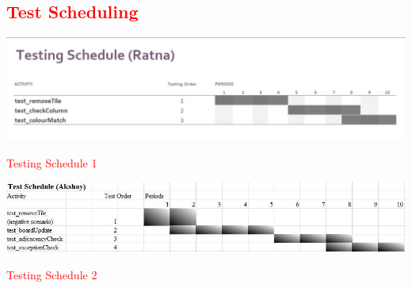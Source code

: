 \documentclass[12pt]{article}
\begin{document}
\textcolor{red}{\section{Test Scheduling}
\begin{table}[h!]
\includegraphics[width = 17cm]{ratnaSchedule}
\caption{Testing Schedule 1}
\end{table}
\begin{table}[h!]
\includegraphics[width = 17cm]{akshaySchedule}
\caption{Testing Schedule 2}
\end{table}}
\end{document}
